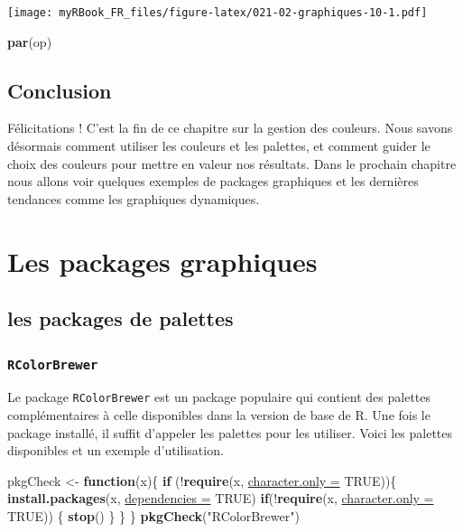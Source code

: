 \documentclass[twoside,symmetric]{book}
\newenvironment{Shaded}{}{}
\newcommand{\ControlFlowTok}[1]{\textbf{#1}}
\newcommand{\DataTypeTok}[1]{\underline{#1}}
\newcommand{\KeywordTok}[1]{\textbf{#1}}
\newcommand{\NormalTok}[1]{#1}
\newcommand{\OperatorTok}[1]{#1}
\newcommand{\OtherTok}[1]{#1}
\newcommand{\StringTok}[1]{#1}
\begin{document}
\texttt{[image: myRBook\_FR\_files/figure-latex/021-02-graphiques-10-1.pdf]}

\begin{Shaded}
\begin{Highlighting}[]
\KeywordTok{par}\NormalTok{(op)}
\end{Highlighting}
\end{Shaded}

\hypertarget{conclusion-9}{%
\section{Conclusion}\label{conclusion-9}}

Félicitations ! C'est la fin de ce chapitre sur la gestion des couleurs. Nous savons désormais comment utiliser les couleurs et les palettes, et comment guider le choix des couleurs pour mettre en valeur nos résultats. Dans le prochain chapitre nous allons voir quelques exemples de packages graphiques et les dernières tendances comme les graphiques dynamiques.

\hypertarget{graph3}{%
\chapter{Les packages graphiques}\label{graph3}}

\minitoc

\hypertarget{les-packages-de-palettes}{%
\section{les packages de palettes}\label{les-packages-de-palettes}}

\hypertarget{rcolorbrewer}{%
\subsection{\texorpdfstring{\texttt{RColorBrewer}}{RColorBrewer}}\label{rcolorbrewer}}

Le package \texttt{RColorBrewer} est un package populaire qui contient des palettes complémentaires à celle disponibles dans la version de base de R. Une fois le package installé, il suffit d'appeler les palettes pour les utiliser. Voici les palettes disponibles et un exemple d'utilisation.

\begin{Shaded}
\begin{Highlighting}[]
\NormalTok{pkgCheck <-}\StringTok{ }\ControlFlowTok{function}\NormalTok{(x)\{ }
    \ControlFlowTok{if}\NormalTok{ (}\OperatorTok{!}\KeywordTok{require}\NormalTok{(x, }\DataTypeTok{character.only =} \OtherTok{TRUE}\NormalTok{))\{}
        \KeywordTok{install.packages}\NormalTok{(x, }\DataTypeTok{dependencies =} \OtherTok{TRUE}\NormalTok{)}
        \ControlFlowTok{if}\NormalTok{(}\OperatorTok{!}\KeywordTok{require}\NormalTok{(x, }\DataTypeTok{character.only =} \OtherTok{TRUE}\NormalTok{)) \{}
            \KeywordTok{stop}\NormalTok{()}
\NormalTok{        \}}
\NormalTok{    \}}
\NormalTok{\}}
\KeywordTok{pkgCheck}\NormalTok{(}\StringTok{"RColorBrewer"}\NormalTok{)}
\end{Highlighting}
\end{Shaded}
\end{document}
